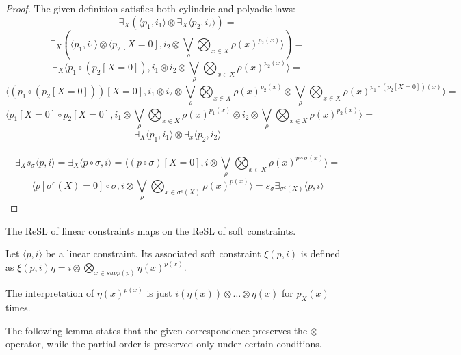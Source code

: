 \documentclass{llncs}
\newcommand{\comment}[1]{}
\def\monid{{\mathbf 0}}
\def\monid{\mathbf{1}}
\begin{document}
\begin{proof}
The given definition satisfies both cylindric and polyadic laws: \\
\[\exists_X (\langle p_1, i_1 \rangle \otimes \exists_X \langle p_2, i_2 \rangle) = \]
\[\exists_X (\langle p_1, i_1 \rangle \otimes \langle p_2[X = 0], i_2 \otimes \bigvee_\rho \bigotimes_{x \in X} \rho(x)^{p_2(x)} \rangle) = \]
\[\exists_X \langle p_1 \circ (p_2[X = 0]), i_1 \otimes i_2 \otimes \bigvee_\rho \bigotimes_{x \in X} \rho(x)^{p_2(x)} \rangle = \]
\[\langle (p_1 \circ (p_2[X = 0]))[X = 0], i_1 \otimes i_2 \otimes \bigvee_\rho \bigotimes_{x \in X} \rho(x)^{p_2(x)} \otimes \bigvee_\rho \bigotimes_{x \in X} \rho(x)^{p_1 \circ (p_2[X = 0])(x)} \rangle = \]
\[\langle p_1[X = 0] \circ p_2[X = 0], i_1 \otimes \bigvee_\rho \bigotimes_{x \in X} \rho(x)^{p_1(x)} \otimes i_2 \otimes \bigvee_\rho \bigotimes_{x \in X} \rho(x)^{p_2(x)} \rangle = \]
\[\exists_X \langle p_1, i_1 \rangle \otimes \exists_x \langle p_2, i_2 \rangle \]
\\
\[\exists_X s_\sigma \langle p, i \rangle = \exists_X \langle p \circ \sigma, i \rangle = \langle (p \circ \sigma)[X = 0], i \otimes \bigvee_\rho \bigotimes_{x \in X} \rho(x)^{p \circ \sigma(x)} \rangle = \]
\[\langle p[\sigma^c(X) = 0] \circ \sigma, i \otimes \bigvee_\rho \bigotimes_{x \in \sigma^c(X)} \rho(x)^{p(x)} \rangle = s_\sigma \exists_{\sigma^c(X)} \langle p, i \rangle \]
\end{proof}

\comment{
In the following, we thus opt for a polynomial representation of linear constraints, 
such as $ax \, + \, by \, + \, i$ with $\{a,b\} \subseteq \mathbb{N}^+$ and
$supp(p) = \{x,y\} \subseteq V$.
}

The ReSL of linear constraints maps on the ReSL of soft constraints.

\begin{definition}\label{def:softconstraints}
	Let $\langle p, i \rangle$ be a linear constraint. Its associated soft constraint
	$\xi(p,i)$ is defined as $\xi(p,i)\eta = i \otimes \bigotimes_{x \in supp(p)} \eta(x)^{p(x)}$.
\end{definition}

The interpretation of $\eta(x)^{p(x)}$ is just $i(\eta(x)) \otimes \ldots \otimes \eta(x)$ for ${p_X(x)}$ times.

The following lemma states that the given correspondence preserves the $\otimes$ operator, while the partial order is preserved only under certain conditions.
\end{document}
